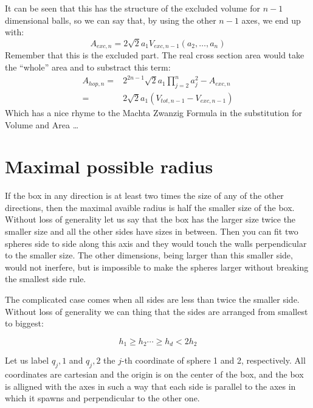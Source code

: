 \documentclass[superscriptaddress,pre,reprint,showpacs,onecolumn]{revtex4-1}
\begin{document}
It can be seen that this has the structure of the excluded volume
for $n-1$ dimensional balls, so we can say that, by using the other
$n-1$ axes, we end up with:
\begin{equation}
  A_{exc,n}=2 \sqrt{2}a_1V_{exc,n-1}(a_2,\ldots,a_n)
\end{equation}
Remember that this is the excluded part. The real cross
section area would take
the ``whole'' area and to substract this term:
\begin{equation}
  \begin{split}
    A_{hop,n}  = & 2^{2n-1}\sqrt{2}a_1\prod_{j=2}^n a_j^2-A_{exc,n} \\
      = & 2 \sqrt{2}a_1 (V_{tot,n-1} - V_{exc,n-1})
  \end{split} 
\end{equation}
Which has a nice rhyme to the Machta Zwanzig Formula in the substitution
for Volume and Area \ldots



\section{Maximal possible radius}

If the box in any direction is at least two times the size of any of
the other directions, then the maximal avaible radius is half the smaller
size of the box. Without loss of generality let us say that the box has
the larger size twice the smaller size and all the other sides have
sizes in between. Then you can fit two spheres side to side along this
axis and they would touch the walls perpendicular to the smaller size.
The other dimensions, being larger than this smaller side, would not
inerfere, but is impossible to make the spheres larger without
breaking the smallest side rule.

The complicated case comes when all sides are less than twice
the smaller side. Without loss of generality we can thing that the sides
are arranged from smallest to biggest:

\begin{equation}\label{ordens}
  h_1 \geq h_2 \cdots \geq h_d < 2 h_2
\end{equation}

Let us label $q_j,1$ and $q_j,2$ the $j$-th coordinate of sphere 1 and 2,
respectively. All coordinates are cartesian and the origin is on the
center of the box, and the box is alligned with the axes in such a way
that each side is parallel to the axes in which it spawns and perpendicular
to the other one. 
\end{document}

